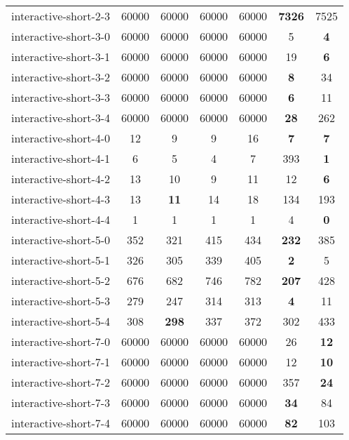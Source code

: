 \documentclass[preview]{standalone}
\begin{document}
\begin{table}[!ht]
\begin{tabular}{lcccccc}
 interactive-short-2-3 & 60000 & 60000 & 60000 & 60000 & \textbf{7326} & 7525 \\ 
 interactive-short-3-0 & 60000 & 60000 & 60000 & 60000 & 5 & \textbf{4} \\ 
 interactive-short-3-1 & 60000 & 60000 & 60000 & 60000 & 19 & \textbf{6} \\ 
 interactive-short-3-2 & 60000 & 60000 & 60000 & 60000 & \textbf{8} & 34 \\ 
 interactive-short-3-3 & 60000 & 60000 & 60000 & 60000 & \textbf{6} & 11 \\ 
 interactive-short-3-4 & 60000 & 60000 & 60000 & 60000 & \textbf{28} & 262 \\ 
 interactive-short-4-0 & 12 & 9 & 9 & 16 & \textbf{7} & \textbf{7} \\ 
 interactive-short-4-1 & 6 & 5 & 4 & 7 & 393 & \textbf{1} \\ 
 interactive-short-4-2 & 13 & 10 & 9 & 11 & 12 & \textbf{6} \\ 
 interactive-short-4-3 & 13 & \textbf{11} & 14 & 18 & 134 & 193 \\ 
 interactive-short-4-4 & 1 & 1 & 1 & 1 & 4 & \textbf{0} \\ 
 interactive-short-5-0 & 352 & 321 & 415 & 434 & \textbf{232} & 385 \\ 
 interactive-short-5-1 & 326 & 305 & 339 & 405 & \textbf{2} & 5 \\ 
 interactive-short-5-2 & 676 & 682 & 746 & 782 & \textbf{207} & 428 \\ 
 interactive-short-5-3 & 279 & 247 & 314 & 313 & \textbf{4} & 11 \\ 
 interactive-short-5-4 & 308 & \textbf{298} & 337 & 372 & 302 & 433 \\ 
 interactive-short-7-0 & 60000 & 60000 & 60000 & 60000 & 26 & \textbf{12} \\ 
 interactive-short-7-1 & 60000 & 60000 & 60000 & 60000 & 12 & \textbf{10} \\ 
 interactive-short-7-2 & 60000 & 60000 & 60000 & 60000 & 357 & \textbf{24} \\ 
 interactive-short-7-3 & 60000 & 60000 & 60000 & 60000 & \textbf{34} & 84 \\ 
 interactive-short-7-4 & 60000 & 60000 & 60000 & 60000 & \textbf{82} & 103 \\ 
 \end{tabular} 
\end{table} 
\end{document}
